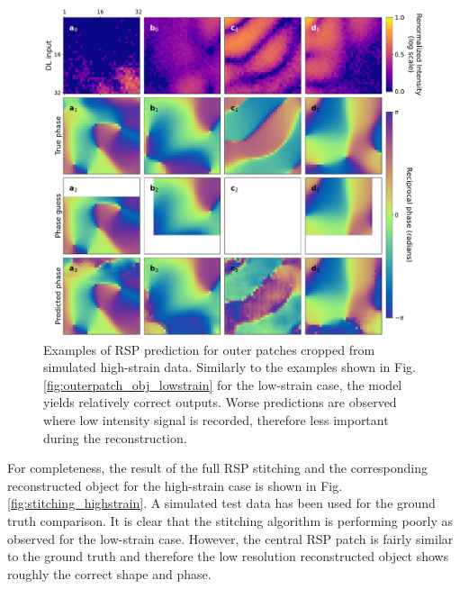 \begin{figure}[H]
    \centering
    \includegraphics[width=\textwidth]{figures/Phasing/outer_patches_high_strain_RSP.pdf}
    \caption{Examples of RSP prediction for outer patches cropped from simulated high-strain data. Similarly to 
    the examples shown in Fig. \ref{fig:outerpatch_obj_lowstrain} for the low-strain case, the model yields relatively 
    correct outputs. Worse predictions are observed where low intensity signal is recorded, therefore less important 
    during the reconstruction.}
    \label{fig:outer_highstrain}
\end{figure}

For completeness, the result of the full RSP stitching and the corresponding reconstructed object for 
the high-strain case is shown in Fig.\ref{fig:stitching_highstrain}. A simulated test data has been used for the ground truth comparison. It is clear that the 
stitching algorithm is performing poorly as observed for the low-strain case. However, the central RSP patch is fairly 
similar to the ground truth and therefore the low resolution reconstructed object shows roughly the correct shape and 
phase. 


